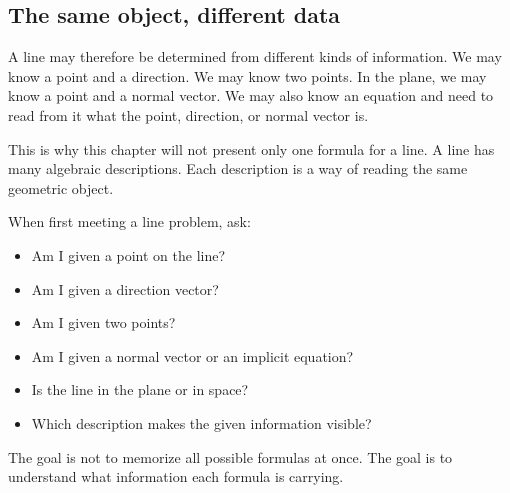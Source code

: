 \subsection*{The same object, different data}

A line may therefore be determined from different kinds of information. We may know a point and a direction. We may know two points. In the plane, we may know a point and a normal vector. We may also know an equation and need to read from it what the point, direction, or normal vector is.

This is why this chapter will not present only one formula for a line. A line has many algebraic descriptions. Each description is a way of reading the same geometric object.

\begin{summarybox}
When first meeting a line problem, ask:
\begin{itemize}
\item Am I given a point on the line?
\item Am I given a direction vector?
\item Am I given two points?
\item Am I given a normal vector or an implicit equation?
\item Is the line in the plane or in space?
\item Which description makes the given information visible?
\end{itemize}
\end{summarybox}

The goal is not to memorize all possible formulas at once. The goal is to understand what information each formula is carrying.